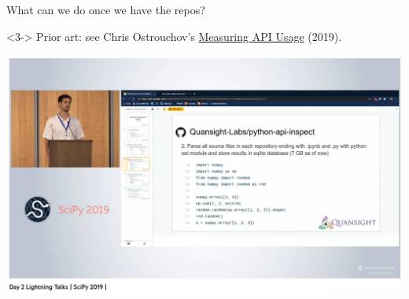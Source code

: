 \documentclass[aspectratio=169]{beamer}
\def\EscMintinline{%
  \FVExtraRobustCommand
  \RobustEscMintinline
  \FVExtraUnexpandedReadOArgMArgEscVArg}
\begin{document}
\begin{frame}{What can we do once we have the repos?}
\vspace{0.5 cm}

\vspace{0.5 cm}

\vspace{0.5 cm}
\begin{uncoverenv}<3->
Prior art: see Chris Ostrouchov's \textcolor{blue}{\href{https://labs.quansight.org/blog/2019/05/python-package-function-usage}{Measuring API Usage}} (2019).

\begin{center}
\includegraphics[width=0.55\linewidth]{PLOTS/chris-ostrouchov.png}
\end{center}
\end{uncoverenv}
\end{frame}
\end{document}
